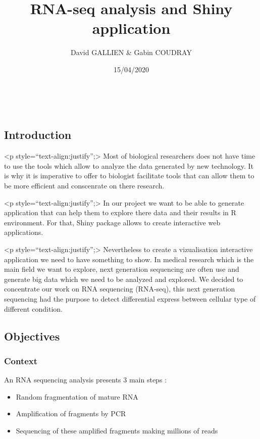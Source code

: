 \documentclass[
]{article}
\title{RNA-seq analysis and Shiny application}
\author{David GALLIEN \& Gabin COUDRAY}
\date{15/04/2020}
\begin{document}
\maketitle

~

\hypertarget{introduction}{%
\subsection{Introduction}\label{introduction}}

\textless p style=``text-align:justify'';\textgreater{} Most of
biological researchers does not have time to use the tools which allow
to analyze the data generated by new technology. It is why it is
imperative to offer to biologist facilitate tools that can allow them to
be more efficient and conscenrate on there research.

\textless p style=``text-align:justify'';\textgreater{} In our project
we want to be able to generate application that can help them to explore
there data and their results in R environment. For that, Shiny package
allows to create interactive web applications.

\textless p style=``text-align:justify'';\textgreater{} Nevertheless to
create a vizualisation interactive application we need to have something
to show. In medical research which is the main field we want to explore,
next generation sequencing are often use and generate big data which we
need to be analyzed and explored. We decided to concentrate our work on
RNA sequencing (RNA-seq), this next generation sequencing had the
purpose to detect differential express between cellular type of
different condition.

\hypertarget{objectives}{%
\subsection{Objectives}\label{objectives}}

\hypertarget{context}{%
\subsubsection{Context}\label{context}}

An RNA sequencing analysis presents 3 main steps :

\begin{itemize}
\item
  Random fragmentation of mature RNA
\item
  Amplification of fragments by PCR
\item
  Sequencing of these amplified fragments making millions of reads
\end{itemize}
\end{document}

